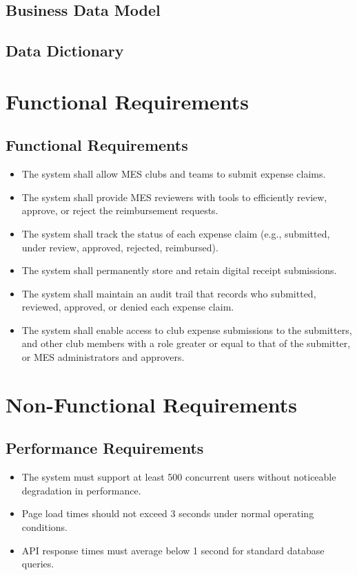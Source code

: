 \documentclass[12pt]{article}
\begin{document}
  \subsection{Business Data Model}
  \subsection{Data Dictionary}

\section{Functional Requirements}
  \subsection{Functional Requirements}
    \begin{itemize}
      \item The system shall allow MES clubs and teams to submit expense claims.
      \item The system shall provide MES reviewers with tools to efficiently review, approve, or reject the reimbursement requests.
      \item The system shall track the status of each expense claim (e.g., submitted, under review, approved, rejected, reimbursed).
      \item The system shall permanently store and retain digital receipt submissions.
      \item The system shall maintain an audit trail that records who submitted, reviewed, approved, or denied each expense claim.
      \item The system shall enable access to club expense submissions to the submitters, and other club members with a role greater or equal to that of the submitter, or MES administrators and approvers.
    \end{itemize}

\section{Non-Functional Requirements}
  \subsection{Performance Requirements}
    \begin{itemize}
        \item The system must support at least 500 concurrent users without noticeable degradation in performance.
        \item Page load times should not exceed 3 seconds under normal operating conditions.
        \item API response times must average below 1 second for standard database queries.
    \end{itemize}
\end{document}
